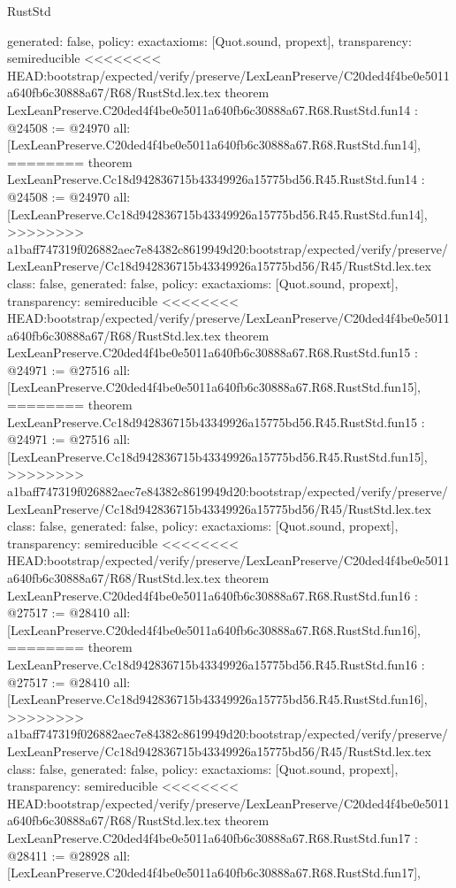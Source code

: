 \begin{lexlean}{RustStd}
\begin{coremodule}
{\begin{coremodule}
{{{{{{{{{{{{{{{{{  generated: false,
  policy: exact{axioms: [Quot.sound, propext]},
  transparency: semireducible
}
<<<<<<<< HEAD:bootstrap/expected/verify/preserve/LexLeanPreserve/C20ded4f4be0e5011a640fb6c30888a67/R68/RustStd.lex.tex
theorem LexLeanPreserve.C20ded4f4be0e5011a640fb6c30888a67.R68.RustStd.fun14 : @24508 := @24970 {
  all: [LexLeanPreserve.C20ded4f4be0e5011a640fb6c30888a67.R68.RustStd.fun14],
========
theorem LexLeanPreserve.Cc18d942836715b43349926a15775bd56.R45.RustStd.fun14 : @24508 := @24970 {
  all: [LexLeanPreserve.Cc18d942836715b43349926a15775bd56.R45.RustStd.fun14],
>>>>>>>> a1baff747319f026882aec7e84382c8619949d20:bootstrap/expected/verify/preserve/LexLeanPreserve/Cc18d942836715b43349926a15775bd56/R45/RustStd.lex.tex
  class: false,
  generated: false,
  policy: exact{axioms: [Quot.sound, propext]},
  transparency: semireducible
}
<<<<<<<< HEAD:bootstrap/expected/verify/preserve/LexLeanPreserve/C20ded4f4be0e5011a640fb6c30888a67/R68/RustStd.lex.tex
theorem LexLeanPreserve.C20ded4f4be0e5011a640fb6c30888a67.R68.RustStd.fun15 : @24971 := @27516 {
  all: [LexLeanPreserve.C20ded4f4be0e5011a640fb6c30888a67.R68.RustStd.fun15],
========
theorem LexLeanPreserve.Cc18d942836715b43349926a15775bd56.R45.RustStd.fun15 : @24971 := @27516 {
  all: [LexLeanPreserve.Cc18d942836715b43349926a15775bd56.R45.RustStd.fun15],
>>>>>>>> a1baff747319f026882aec7e84382c8619949d20:bootstrap/expected/verify/preserve/LexLeanPreserve/Cc18d942836715b43349926a15775bd56/R45/RustStd.lex.tex
  class: false,
  generated: false,
  policy: exact{axioms: [Quot.sound, propext]},
  transparency: semireducible
}
<<<<<<<< HEAD:bootstrap/expected/verify/preserve/LexLeanPreserve/C20ded4f4be0e5011a640fb6c30888a67/R68/RustStd.lex.tex
theorem LexLeanPreserve.C20ded4f4be0e5011a640fb6c30888a67.R68.RustStd.fun16 : @27517 := @28410 {
  all: [LexLeanPreserve.C20ded4f4be0e5011a640fb6c30888a67.R68.RustStd.fun16],
========
theorem LexLeanPreserve.Cc18d942836715b43349926a15775bd56.R45.RustStd.fun16 : @27517 := @28410 {
  all: [LexLeanPreserve.Cc18d942836715b43349926a15775bd56.R45.RustStd.fun16],
>>>>>>>> a1baff747319f026882aec7e84382c8619949d20:bootstrap/expected/verify/preserve/LexLeanPreserve/Cc18d942836715b43349926a15775bd56/R45/RustStd.lex.tex
  class: false,
  generated: false,
  policy: exact{axioms: [Quot.sound, propext]},
  transparency: semireducible
}
<<<<<<<< HEAD:bootstrap/expected/verify/preserve/LexLeanPreserve/C20ded4f4be0e5011a640fb6c30888a67/R68/RustStd.lex.tex
theorem LexLeanPreserve.C20ded4f4be0e5011a640fb6c30888a67.R68.RustStd.fun17 : @28411 := @28928 {
  all: [LexLeanPreserve.C20ded4f4be0e5011a640fb6c30888a67.R68.RustStd.fun17],
}}}}}}}}}}}}}}}}}}}}
\end{coremodule}}
\end{coremodule}
\end{lexlean}
